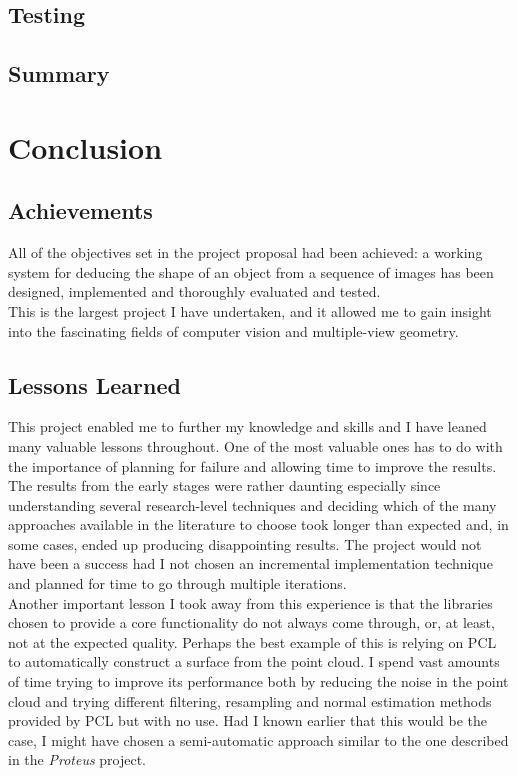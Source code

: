 \documentclass[12pt,a4paper,twoside,openright]{report}
\begin{document}
\section{Testing}

\section{Summary}

\chapter{Conclusion}


\section{Achievements}
All of the objectives set in the project proposal had been achieved: a working system for deducing the shape of an object from a sequence of images has been designed, implemented and thoroughly evaluated and tested.\\
\linebreak
This is the largest project I have undertaken, and it allowed me to gain insight into the fascinating fields of computer vision and multiple-view geometry. 

\section{Lessons Learned}
This project enabled me to further my knowledge and skills and I have leaned many valuable lessons throughout. One of the most valuable ones has to do with the importance of planning for failure and allowing time to improve the results. The results from the early stages were rather daunting especially since understanding several research-level techniques and deciding which of the many approaches available in the literature to choose took longer than expected and, in some cases, ended up producing disappointing results. The project would not have been a success had I not chosen an incremental implementation technique and planned for time to go through multiple iterations.\\
\linebreak
Another important lesson I took away from this experience is that the libraries chosen to provide a core functionality do not always come through, or, at least,  not at the expected quality. Perhaps the best example of this is relying on PCL to automatically construct a surface from the point cloud. I spend vast amounts of time trying to improve its performance both by reducing the noise in the point cloud and trying different filtering, resampling and normal estimation methods provided by PCL but with no use. Had I known earlier that this would be the case, I might have chosen a semi-automatic approach similar to the one described in the \emph{Proteus}\cite{ProteusInteractiveSFM} project.
\end{document}
